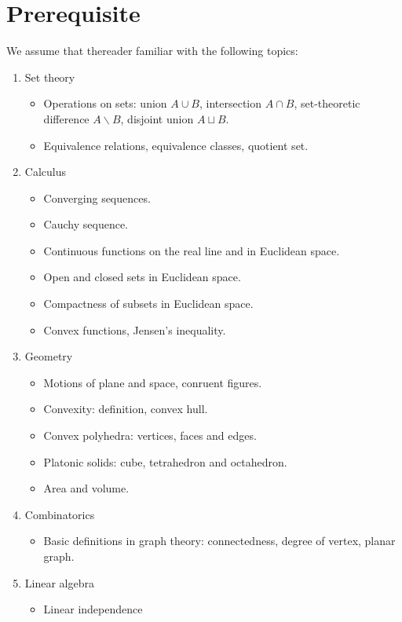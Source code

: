 \addtocounter{chapter}{-1}
\chapter{Prerequisite}
We assume that thereader familiar with the following topics:
\begin{enumerate}
\item Set theory
\begin{itemize}
\item Operations on sets: union $A \cup B$, intersection $A \cap B$,  set-theoretic difference $A \backslash B$, disjoint union $A \sqcup B$.
\item Equivalence relations,  equivalence classes, quotient set.
\end{itemize}

\item Calculus
\begin{itemize}
\item Converging sequences.
\item Cauchy sequence.
\item Continuous functions on the real line and in Euclidean space.
\item Open and closed sets in Euclidean space.
\item Compactness of subsets in Euclidean space.
\item Convex functions, Jensen's inequality.
\end{itemize}

\item Geometry
\begin{itemize}
\item Motions of plane and space, conruent figures. 
\item Convexity: definition, convex hull.
\item Convex polyhedra: vertices, faces and edges.
\item Platonic solids: cube, tetrahedron and octahedron.
\item Area and volume.
\end{itemize}

\item Combinatorics
\begin{itemize}
 \item  Basic definitions in graph theory: connectedness, degree of vertex, planar graph.
\end{itemize}

\item Linear algebra
\begin{itemize}
 \item Linear independence 
\end{itemize}



\end{enumerate}
